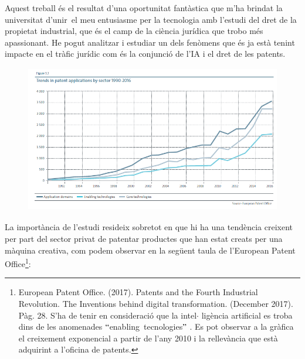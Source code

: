 \documentclass[12pt]{article}
\begin{document}
\vspace{\baselineskip}
\begin{justify}
Aquest treball és el resultat d’una oportunitat fantàstica que m’ha brindat la universitat d’unir\ el meu entusiasme per la tecnologia amb l’estudi del dret de la propietat industrial, que és el camp de la ciència jurídica que trobo més apassionant.  He pogut analitzar i estudiar un dels fenòmens que és ja està tenint impacte en el tràfic jurídic com és la conjunció de l’IA i el dret de les patents. 
\end{justify}\par


\vspace{\baselineskip}



\begin{figure}[H]
\advance\leftskip 0.15in		\includegraphics[width=5.08in,height=2.54in]{./media/image2.png}
\end{figure}



\begin{justify}
La importància de l’estudi resideix sobretot en que hi ha una tendència creixent per part del sector privat de patentar productes que han estat creats per una màquina creativa, com podem observar en la següent taula de l’European Patent Office\footnote{ European Patent Office. (2017). Patents and the Fourth Industrial Revolution. The Inventions behind digital transformation. (December 2017). Pàg. 28. S’ha de tenir en consideració que la intel$ \cdot $ ligència artificial es troba dins de les anomenades $``$enabling\ tecnologies$"$ . Es pot observar  a la gràfica el creixement exponencial a partir de l’any 2010 i la rellevància que està adquirint a l’oficina de patents.  }:
\end{justify}\par
\end{document}
